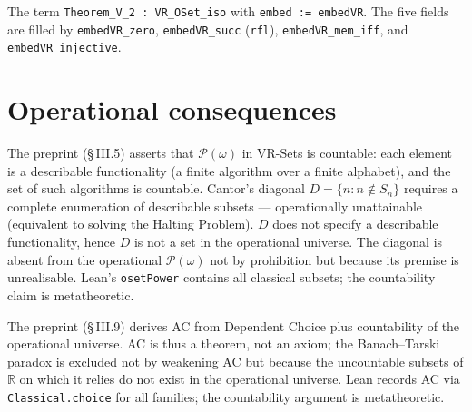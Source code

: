 \begin{theorem}
\label{thm:Theorem_V_2}
\leanok
{}
The term \texttt{Theorem\_V\_2 : VR\_OSet\_iso} with
\texttt{embed := embedVR}.  The five fields are filled by
\texttt{embedVR\_zero}, \texttt{embedVR\_succ} (\texttt{rfl}),
\texttt{embedVR\_mem\_iff}, and \texttt{embedVR\_injective}.
\end{theorem}

\section{Operational consequences}
\label{sec:sets_consequences}

\begin{remark}
\label{rem:powerset_countable}
\leanok
{}
The preprint (§\,III.5) asserts that $\mathcal{P}(\omega)$ in VR-Sets is
countable: each element is a describable functionality (a finite
algorithm over a finite alphabet), and the set of such algorithms is
countable.  Cantor's diagonal $D = \{n : n \notin S_n\}$ requires a
complete enumeration of describable subsets --- operationally
unattainable (equivalent to solving the Halting Problem).  $D$ does
not specify a describable functionality, hence $D$ is not a set in the
operational universe.  The diagonal is absent from the operational
$\mathcal{P}(\omega)$ not by prohibition but because its premise is
unrealisable.  Lean's \texttt{osetPower} contains all classical subsets;
the countability claim is metatheoretic.
\end{remark}

\begin{remark}
\label{rem:AC_theorem}
\leanok
{}
The preprint (§\,III.9) derives AC from Dependent Choice plus countability
of the operational universe.  AC is thus a theorem, not an axiom; the
Banach--Tarski paradox is excluded not by weakening AC but because the
uncountable subsets of $\mathbb{R}$ on which it relies do not exist in
the operational universe.  Lean records AC via \texttt{Classical.choice}
for all families; the countability argument is metatheoretic.
\end{remark}


